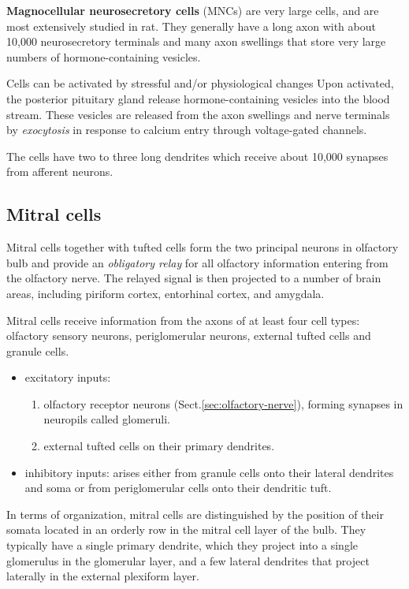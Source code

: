{\bf Magnocellular neurosecretory cells} (MNCs) are very large cells, and
are most extensively studied in rat. They generally have a long axon
with about 10,000 neurosecretory terminals and many axon swellings
that store very large numbers of hormone-containing vesicles. 

Cells can be activated by stressful and/or physiological changes Upon activated,
the posterior pituitary gland release hormone-containing vesicles into the blood
stream. These vesicles are released from the axon swellings and nerve terminals
by {\it exocytosis} in response to calcium entry through voltage-gated channels.

The cells have two to three long dendrites which receive about 10,000
synapses from afferent neurons. 


\subsection{Mitral cells}
\label{sec:mitral-cell}

Mitral cells together with tufted cells form the two principal neurons in
olfactory bulb and provide an {\it obligatory relay} for all olfactory
information entering from the olfactory nerve. The relayed signal is then
projected to a number of brain areas, including piriform cortex, entorhinal
cortex, and amygdala.


Mitral cells receive information from the axons of at least four cell types:
olfactory sensory neurons, periglomerular neurons, external tufted cells and
granule cells.
\begin{itemize}

  \item excitatory inputs: 
  
  \begin{enumerate}
    \item  olfactory receptor neurons  (Sect.\ref{sec:olfactory-nerve}),
    forming synapses in neuropils called glomeruli.

    \item external tufted cells on their primary dendrites. 
  \end{enumerate}
 
  \item inhibitory inputs: arises either from granule cells onto their lateral
  dendrites and soma or from periglomerular cells onto their dendritic tuft.
\end{itemize}


In terms of organization, mitral cells are distinguished by the position of
their somata located in an orderly row in the mitral cell layer of the bulb.
They typically have a single primary dendrite, which they project into a single
glomerulus in the glomerular layer, and a few lateral dendrites that project
laterally in the external plexiform layer.
 
